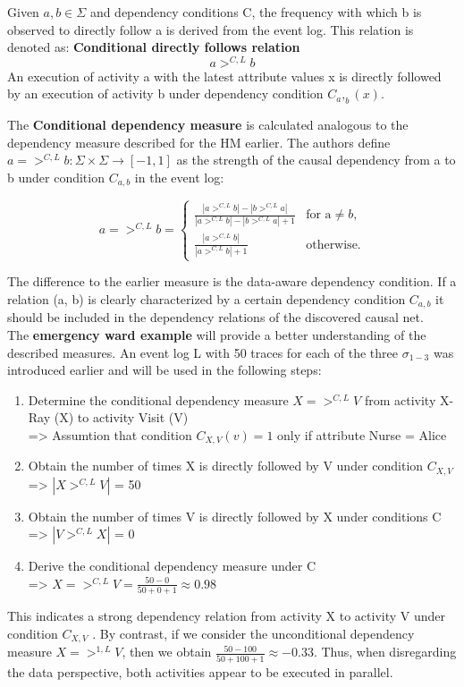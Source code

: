 \noindent Given $a, b \in \Sigma$ and dependency conditions C, the frequency with which b is observed to directly follow a is derived from the event log. This relation is denoted as:
\noindent\textbf{Conditional directly follows relation}
\[a >^{C,L} b\]
An execution of activity a with the latest attribute values x is directly followed by an execution of activity b under dependency condition $C_a,_b(x)$.

\noindent The \textbf{Conditional dependency measure} is calculated analogous to the dependency measure described for the HM earlier. The authors define 
$a => ^{C,L}b: \Sigma \times \Sigma \rightarrow [-1, 1]$ as the strength of the causal
dependency from a to b under condition $C_{a,b}$ in the event log:

\[a => ^{C,L}b = 
\begin{cases}
		\frac{|a>^{C,L}b|-|b>^{C,L}a|}{|a>^{C,L}b|-|b>^{C,L}a|+1} & \text{for a} \neq b,\\
		\frac{|a>^{C,L}b|}{|a>^{C,L}b|+1} & \text{otherwise}.
\end{cases}
\]

\noindent The difference to the earlier measure is the data-aware dependency condition. 
If a relation (a, b) is clearly characterized by a certain dependency condition $C_{a,b}$ it should be included in the dependency relations of the discovered causal net.\\

\noindent The \textbf{emergency ward example} will provide a better understanding of the described measures. An event log L with 50 traces for each of the three $\sigma_{1-3}$ was introduced earlier and will be used in the following steps:
\begin{enumerate}\setlength{\itemsep}{1pt}
\item Determine the conditional dependency measure $X => ^{C,L} V$ from activity X-Ray (X) to activity Visit (V)\\
=> Assumtion that condition $C_{X,V}(v) = 1$ only if attribute Nurse = Alice
\item Obtain the number of times X is directly followed by V under condition $C_{X,V}$\\
=> $|X >^{C,L} V|$ = 50
\item Obtain the number of times V is directly followed by X under conditions C \\
=> $|V >^{C,L} X|$ = 0
\item Derive the conditional dependency measure under C \\
=> $X => ^{C,L} V = \frac{50-0}{50+0+1} \approx 0.98$
\end{enumerate}
This indicates a strong dependency relation from activity X to activity V under condition $C_{X,V}$ . By contrast, if we consider the unconditional dependency measure $X => ^{1,L} V$, then we obtain $\frac{50-100}{50+100+1} \approx -0.33$.
Thus, when disregarding the data perspective, both activities appear to be executed in parallel.\protect\cite{Mannhardt17}

